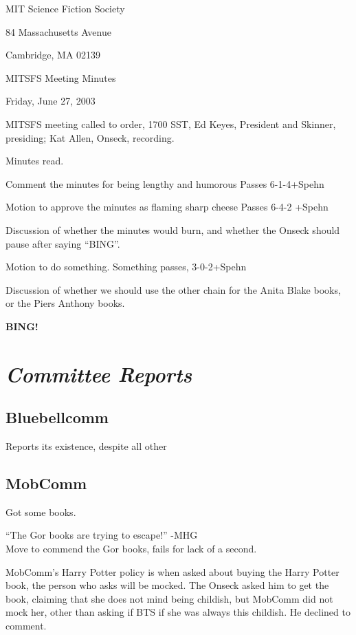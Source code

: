 \documentclass[12pt]{article}
\newcommand{\bing}{{\bf BING!} }
\newcommand{\goto}[1]{\bing \vskip 12pt \section*{{\em{#1}}}}
\begin{document}
\begin{center}

MIT Science Fiction Society 

84 Massachusetts Avenue

Cambridge, MA 02139

\vspace{12pt}

MITSFS Meeting Minutes 

Friday, June 27, 2003

\end{center}
 
\vspace{18pt}

\setlength{\parskip}{6pt}

\noindent
MITSFS meeting called to order, 1700 SST, Ed Keyes, President and
Skinner, presiding; Kat Allen,  Onseck, recording.

Minutes read.

Comment the minutes for being lengthy and humorous
Passes 6-1-4+Spehn

Motion to approve the minutes as flaming sharp cheese
Passes 6-4-2 +Spehn

Discussion of whether the minutes would burn, and whether the Onseck
should pause after saying ``BING''.  

Motion to do something.
Something passes, 3-0-2+Spehn

Discussion of whether we should use the other chain for the Anita
Blake books, or the Piers Anthony books.

\goto{Committee Reports}
\subsection*{Bluebellcomm}
Reports its existence, despite all other 
\subsection*{MobComm}
Got some books.

``The Gor books are trying to escape!'' -MHG\\
Move to commend the Gor books, fails for lack of a second.

MobComm's Harry Potter policy is when asked about buying the Harry
Potter book, the person who asks will be mocked.
The Onseck asked him to get the book, claiming that she does not mind
being childish, but MobComm did not mock her, other than asking if BTS
if she was always this childish. He declined to comment.
\end{document}
